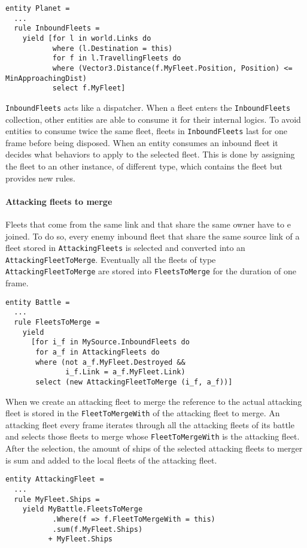 \begin{lstlisting}
entity Planet =    
  ...  
  rule InboundFleets =
    yield [for l in world.Links do     
           where (l.Destination = this)
           for f in l.TravellingFleets do
           where (Vector3.Distance(f.MyFleet.Position, Position) <= MinApproachingDist)
           select f.MyFleet]
\end{lstlisting}

\texttt{InboundFleets} acts like a dispatcher. When a fleet enters the \texttt{InboundFleets} collection, other entities are able to consume it for their internal logics. To avoid entities to consume twice the same fleet, fleets in \texttt{InboundFleets} last for one frame before being disposed. When an entity consumes an inbound fleet it decides what behaviors to apply to the selected fleet. This is done by assigning the fleet to an other instance, of different type, which contains the fleet but provides new rules.


\paragraph{Attacking fleets to merge}
Fleets that come from the same link and that share the same owner have to e joined. To do so, every enemy inbound fleet that share the same source link of a fleet stored in \texttt{AttackingFleets} is selected and converted into an \texttt{AttackingFleetToMerge}. Eventually all the fleets of type \texttt{AttackingFleetToMerge} are stored into \texttt{FleetsToMerge} for the duration of one frame.
\begin{lstlisting}
entity Battle =
  ...
  rule FleetsToMerge =
    yield
      [for i_f in MySource.InboundFleets do
       for a_f in AttackingFleets do
       where (not a_f.MyFleet.Destroyed &&
              i_f.Link = a_f.MyFleet.Link)
       select (new AttackingFleetToMerge (i_f, a_f))]
\end{lstlisting}

When we create an attacking fleet to merge the reference to the actual attacking fleet is stored in the \texttt{FleetToMergeWith} of the attacking fleet to merge. An attacking fleet every frame iterates through all the attacking fleets of its battle and selects those fleets to merge whose \texttt{FleetToMergeWith} is the attacking fleet. After the selection, the amount of ships of the selected attacking fleets to merger is sum and added to the local fleets of the attacking fleet.
\begin{lstlisting}
entity AttackingFleet =
  ...
  rule MyFleet.Ships =      
    yield MyBattle.FleetsToMerge
           .Where(f => f.FleetToMergeWith = this)
           .sum(f.MyFleet.Ships) 
          + MyFleet.Ships
\end{lstlisting}


